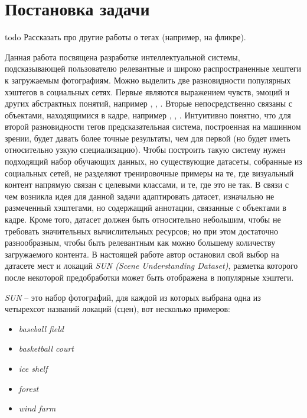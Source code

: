 \section{Постановка задачи}

todo Рассказать про другие работы о тегах (например, на фликре).
\cite{hashtags1}
\cite{hashtags2}
\cite{hashtags3}
\cite{hashtags4}


\indent
\indent
Данная работа посвящена разработке интеллектуальной системы, 
подсказывающей пользователю релевантные и широко распространенные
хештеги к загружаемым фотографиям.
Можно выделить две разновидности популярных хэштегов в социальных сетях.
Первые являются выражением чувств, эмоций и других абстрактных понятий,
например , , . Вторые непосредственно
связаны с объектами, находящимися в кадре, например  
, , . 
Интуитивно понятно, что для второй разновидности
тегов предсказательная система, построенная на машинном зрении, будет
давать более точные результаты, чем для первой (но будет
иметь относительно узкую специализацию). Чтобы построить такую систему
нужен подходящий набор обучающих данных, но существующие датасеты, 
собранные из социальных сетей, не разделяют тренировочные примеры на те, 
где визуальный контент напрямую связан с целевыми классами, и те, где это не так.
В связи с чем возникла идея для данной задачи 
адаптировать датасет, изначально не размеченный
хэштегами, но содержащий аннотации, связанные с объектами
 в кадре. Кроме того, датасет должен быть относительно небольшим,
чтобы не требовать значительных 
вычислительных ресурсов; но при этом достаточно разнообразным, чтобы 
быть релевантным как можно большему количеству загружаемого контента.
В настоящей работе автор остановил свой выбор на датасете мест и локаций 
 \textit{SUN\cite{sundata} (Scene Understanding Dataset)}, 
 разметка которого после некоторой предобработки может быть отображена в популярные хэштеги.


\indent  
\textit{SUN} -- это набор фотографий, для каждой из которых выбрана одна
 из четырехсот названий локаций (сцен), вот несколько примеров:
  
  
\begin{itemize}
    \item \textit{baseball field}
    \item \textit{basketball court}
    \item \textit{ice shelf}
    \item \textit{forest}
    \item \textit{wind farm}
\end{itemize}


